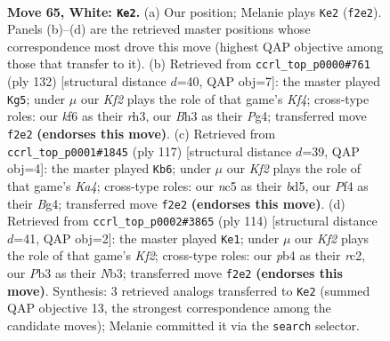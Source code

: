 \documentclass[11pt]{article}
\begin{document}
\clearpage

\begin{figure}[p]\centering
\begin{subfigure}{0.46\textwidth}\centering
\resizebox{\linewidth}{!}{%
\newchessgame
\chessboard[
  setfen={b7/P7/5k2/2n3N1/1p3P2/1P4PB/5K1P/R7 w - - 2 65},
  showmover=false,
  pgfstyle=straightmove, color=movearrow, markmove={f2-e2}
]}
\caption{}
\end{subfigure}\hfill
\begin{subfigure}{0.46\textwidth}\centering
\resizebox{\linewidth}{!}{%
\newchessgame
\chessboard[
  setfen={8/8/pB2k3/8/bP3KP1/P3N2r/5P2/8 w - - 19 67},
  showmover=false,
  pgfstyle=straightmove, color=movearrow, markmove={f4-g5}
]}
\caption{}
\end{subfigure}
\\[4pt]
\begin{subfigure}{0.46\textwidth}\centering
\resizebox{\linewidth}{!}{%
\newchessgame
\chessboard[
  setfen={8/R7/8/kp1Bp1p1/4P1bp/7r/2N3K1/8 b - - 1 59},
  showmover=false,
  pgfstyle=straightmove, color=movearrow, markmove={a5-b6}
]}
\caption{}
\end{subfigure}\hfill
\begin{subfigure}{0.46\textwidth}\centering
\resizebox{\linewidth}{!}{%
\newchessgame
\chessboard[
  setfen={3R4/4p2p/k7/P5p1/5nP1/1N3P2/2r2K2/8 w - - 2 58},
  showmover=false,
  pgfstyle=straightmove, color=movearrow, markmove={f2-e1}
]}
\caption{}
\end{subfigure}
\caption{\textbf{Move 65, White: \texttt{Ke2}.} (a) Our position; Melanie plays \texttt{Ke2} (\texttt{f2e2}). Panels (b)--(d) are the retrieved master positions whose correspondence most drove this move (highest QAP objective among those that transfer to it). (b) Retrieved from \texttt{ccrl\_top\_p0000\#761} (ply 132) [structural distance $d$=40, QAP obj=7]: the master played \texttt{Kg5}; under $\mu$ our \emph{Kf2} plays the role of that game's \emph{Kf4}; cross-type roles: our \emph{k}f6 as their \emph{r}h3, our \emph{B}h3 as their \emph{P}g4; transferred move \texttt{f2e2} \textbf{(endorses this move)}. (c) Retrieved from \texttt{ccrl\_top\_p0001\#1845} (ply 117) [structural distance $d$=39, QAP obj=4]: the master played \texttt{Kb6}; under $\mu$ our \emph{Kf2} plays the role of that game's \emph{Ka4}; cross-type roles: our \emph{n}c5 as their \emph{b}d5, our \emph{P}f4 as their \emph{B}g4; transferred move \texttt{f2e2} \textbf{(endorses this move)}. (d) Retrieved from \texttt{ccrl\_top\_p0002\#3865} (ply 114) [structural distance $d$=41, QAP obj=2]: the master played \texttt{Ke1}; under $\mu$ our \emph{Kf2} plays the role of that game's \emph{Kf2}; cross-type roles: our \emph{p}b4 as their \emph{r}c2, our \emph{P}b3 as their \emph{N}b3; transferred move \texttt{f2e2} \textbf{(endorses this move)}. Synthesis: 3 retrieved analogs transferred to \texttt{Ke2} (summed QAP objective 13, the strongest correspondence among the candidate moves); Melanie committed it via the \texttt{search} selector.}
\label{fig:thought-m128}
\end{figure}
\end{document}
